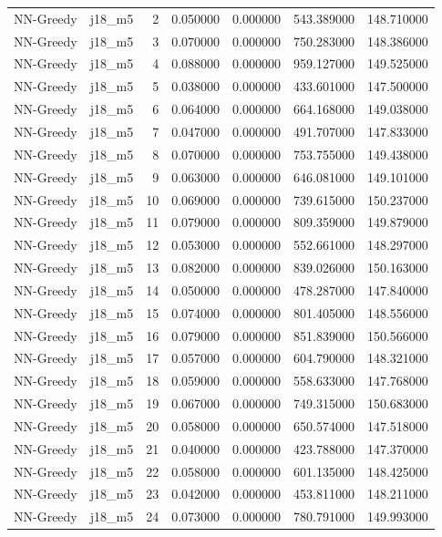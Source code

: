 \begin{tabular}{llrrrrr}
NN-Greedy & j18_m5 & 2 & 0.050000 & 0.000000 & 543.389000 & 148.710000 \\
NN-Greedy & j18_m5 & 3 & 0.070000 & 0.000000 & 750.283000 & 148.386000 \\
NN-Greedy & j18_m5 & 4 & 0.088000 & 0.000000 & 959.127000 & 149.525000 \\
NN-Greedy & j18_m5 & 5 & 0.038000 & 0.000000 & 433.601000 & 147.500000 \\
NN-Greedy & j18_m5 & 6 & 0.064000 & 0.000000 & 664.168000 & 149.038000 \\
NN-Greedy & j18_m5 & 7 & 0.047000 & 0.000000 & 491.707000 & 147.833000 \\
NN-Greedy & j18_m5 & 8 & 0.070000 & 0.000000 & 753.755000 & 149.438000 \\
NN-Greedy & j18_m5 & 9 & 0.063000 & 0.000000 & 646.081000 & 149.101000 \\
NN-Greedy & j18_m5 & 10 & 0.069000 & 0.000000 & 739.615000 & 150.237000 \\
NN-Greedy & j18_m5 & 11 & 0.079000 & 0.000000 & 809.359000 & 149.879000 \\
NN-Greedy & j18_m5 & 12 & 0.053000 & 0.000000 & 552.661000 & 148.297000 \\
NN-Greedy & j18_m5 & 13 & 0.082000 & 0.000000 & 839.026000 & 150.163000 \\
NN-Greedy & j18_m5 & 14 & 0.050000 & 0.000000 & 478.287000 & 147.840000 \\
NN-Greedy & j18_m5 & 15 & 0.074000 & 0.000000 & 801.405000 & 148.556000 \\
NN-Greedy & j18_m5 & 16 & 0.079000 & 0.000000 & 851.839000 & 150.566000 \\
NN-Greedy & j18_m5 & 17 & 0.057000 & 0.000000 & 604.790000 & 148.321000 \\
NN-Greedy & j18_m5 & 18 & 0.059000 & 0.000000 & 558.633000 & 147.768000 \\
NN-Greedy & j18_m5 & 19 & 0.067000 & 0.000000 & 749.315000 & 150.683000 \\
NN-Greedy & j18_m5 & 20 & 0.058000 & 0.000000 & 650.574000 & 147.518000 \\
NN-Greedy & j18_m5 & 21 & 0.040000 & 0.000000 & 423.788000 & 147.370000 \\
NN-Greedy & j18_m5 & 22 & 0.058000 & 0.000000 & 601.135000 & 148.425000 \\
NN-Greedy & j18_m5 & 23 & 0.042000 & 0.000000 & 453.811000 & 148.211000 \\
NN-Greedy & j18_m5 & 24 & 0.073000 & 0.000000 & 780.791000 & 149.993000 \\

\end{tabular}
